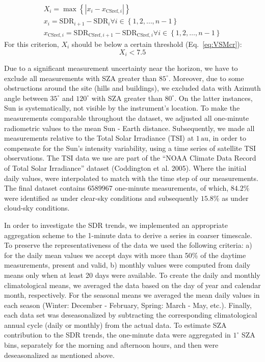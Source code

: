 \documentclass[
  preprint, 3p, authoryear]{article}
\begin{document}
\begin{enumerate}
  \begin{gather}
    X_i = \max{\left \{ \left | x_i - x_{\text{CSref},i} \right | \right \}} \label{eq:VSM3} \\
    x_i = \text{SDR}_{i+1} - \text{SDR}_{i} \forall i \in \left \{ 1, 2, \ldots, n-1 \right \} \label{eq:VSM1} \\
    x_{\text{CSref},i} = \text{SDR}_{\text{CSref},i+1} - \text{SDR}_{\text{CSref},i} \forall i \in \left \{ 1, 2, \ldots, n-1 \right \} \label{eq:VSM2}
  \end{gather}
  For this criterion, \(X_i\) should be below a certain threshold (Eq.~\ref{eq:VSMcr}):
  \begin{equation}
    X_i < 7.5 \label{eq:VSMcr}
  \end{equation}
\end{enumerate}

Due to a significant measurement uncertainty near the horizon, we have to exclude all measurements with SZA greater than \(85^\circ\).
Moreover, due to some obstructions around the site (hills and buildings), we excluded data with Azimuth angle between
\(35^\circ\) and \(120^\circ\) with SZA greater than \(80^\circ\).
On the latter instances, Sun is systematically, not visible by the instrument's location.
To make the measurements comparable throughout the dataset, we adjusted all one-minute radiometric values to the mean Sun - Earth distance.
Subsequently, we made all measurements relative to the Total Solar Irradiance (TSI) at \(1\,\text{au}\), in order to compensate for the Sun's intensity variability, using a time series of satellite TSI observations.
The TSI data we use are part of the ``NOAA Climate Data Record of Total Solar Irradiance'' dataset (Coddington et al. 2005).
Where the initial daily values, were interpolated to match with the time step of our measurements.
The final dataset contains
\(6589967\)
one-minute measurements, of which,
\(84.2\%\)
were identified as under clear-sky conditions and subsequently
\(15.8\%\)
as under cloud-sky conditions.

In order to investigate the SDR trends, we implemented an appropriate aggregation scheme to the 1-minute data to derive a series in coarser timescale.
To preserve the representativeness of the data we used the following criteria:
a) for the daily mean values we accept days with more than 50\% of the daytime measurements, present and valid,
b) monthly values were computed from daily means
only when at least 20 days were available.
To create the daily and monthly climatological means, we averaged the data based on the day of year and calendar month, respectively.
For the seasonal means we averaged the mean daily values in each season (Winter: December - February, Spring: March - May, etc.).
Finally, each data set was deseasonalized by subtracting the corresponding climatological annual cycle (daily or monthly) from the actual data.
To estimate SZA contribution to the SDR trends, the one-minute data were aggregated in \(1^\circ\) SZA bins, separately for the morning and afternoon hours, and then were deseasonalized as mentioned above.
\end{document}

